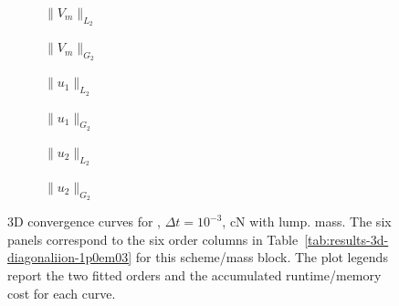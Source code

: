 \begin{figure}[p]
\centering
\begin{subfigure}{0.485\linewidth}
\centering
{}
\caption{$\|V_m\|_{L_2}$}
\label{fig:results-3d-diagonaliion-1p0em03-cranknicolson-lumped-a}
\end{subfigure}
\hfill
\begin{subfigure}{0.485\linewidth}
\centering
{}
\caption{$\|V_m\|_{G_2}$}
\label{fig:results-3d-diagonaliion-1p0em03-cranknicolson-lumped-b}
\end{subfigure}
\par\vspace{0.8em}
\begin{subfigure}{0.485\linewidth}
\centering
{}
\caption{$\|u_1\|_{L_2}$}
\label{fig:results-3d-diagonaliion-1p0em03-cranknicolson-lumped-c}
\end{subfigure}
\hfill
\begin{subfigure}{0.485\linewidth}
\centering
{}
\caption{$\|u_1\|_{G_2}$}
\label{fig:results-3d-diagonaliion-1p0em03-cranknicolson-lumped-d}
\end{subfigure}
\par\vspace{0.8em}
\begin{subfigure}{0.485\linewidth}
\centering
{}
\caption{$\|u_2\|_{L_2}$}
\label{fig:results-3d-diagonaliion-1p0em03-cranknicolson-lumped-e}
\end{subfigure}
\hfill
\begin{subfigure}{0.485\linewidth}
\centering
{}
\caption{$\|u_2\|_{G_2}$}
\label{fig:results-3d-diagonaliion-1p0em03-cranknicolson-lumped-f}
\end{subfigure}
\caption{3D convergence curves for , $\Delta t=10^{-3}$, cN with lump. mass. The six panels correspond to the six order columns in Table~\ref{tab:results-3d-diagonaliion-1p0em03} for this scheme/mass block. The plot legends report the two fitted orders and the accumulated runtime/memory cost for each curve.}
\label{fig:results-3d-diagonaliion-1p0em03-cranknicolson-lumped}
\end{figure}
\FloatBarrier

